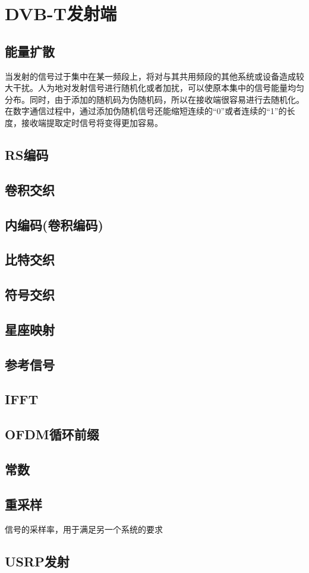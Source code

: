 \chapter{DVB-T发射端}

	\section{能量扩散}
		\par 当发射的信号过于集中在某一频段上，将对与其共用频段的其他系统或设备造成较大干扰。人为地对发射信号进行随机化或者加扰，可以使原本集中的信号能量均匀分布。同时，由于添加的随机码为伪随机码，所以在接收端很容易进行去随机化。在数字通信过程中，通过添加伪随机信号还能缩短连续的“0”或者连续的“1”的长度，接收端提取定时信号将变得更加容易。
	\section{RS编码}
	\section{卷积交织}
	\section{内编码(卷积编码)}
	\section{比特交织}
	\section{符号交织}
	\section{星座映射}
	\section{参考信号}
	\section{IFFT}
	\section{OFDM循环前缀}
	\section{常数}
	\section{重采样}
		\par 信号的采样率，用于满足另一个系统的要求
	\section{USRP发射}
